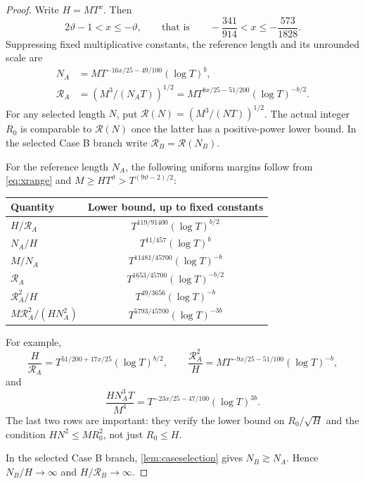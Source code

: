 \documentclass[11pt,reqno]{amsart}
\numberwithin{equation}{section}
\theoremstyle{definition}
\theoremstyle{remark}
\newcommand{\vth}{\vartheta}
\newcommand{\blocklog}{b}
\begin{document}
\begin{proof}
Write $H=MT^x$. Then
\begin{equation}\label{eq:xrange}
 2\vth-1<x\le-\vth,\qquad\text{that is}\qquad-\frac{341}{914}<x\le-\frac{573}{1828}.
\end{equation}
Suppressing fixed multiplicative constants, the reference length and its unrounded scale are
\begin{align}
 N_A&=M T^{-16x/25-49/100}(\log T)^{\blocklog},\\
 \mathcal R_A&=(M^3/(N_AT))^{1/2}
 =M T^{8x/25-51/200}(\log T)^{-\blocklog/2}.
\end{align}
For any selected length $N$, put $\mathcal R(N)=(M^3/(NT))^{1/2}$. The actual integer $R_0$ is comparable to $\mathcal R(N)$ once the latter has a positive-power lower bound. In the selected Case B branch write $\mathcal R_B=\mathcal R(N_B)$.

For the reference length $N_A$, the following uniform margins follow from \eqref{eq:xrange} and
$M\ge HT^{\vth}>T^{(9\vth-2)/2}$:
\begin{center}
\renewcommand{\arraystretch}{1.35}
\begin{tabular}{@{}lc@{}}
\toprule
Quantity & Lower bound, up to fixed constants\\
\midrule
$H/\mathcal R_A$ & $T^{119/91400}(\log T)^{\blocklog/2}$\\
$N_A/H$ & $T^{11/457}(\log T)^{\blocklog}$\\
$M/N_A$ & $T^{11481/45700}(\log T)^{-\blocklog}$\\
$\mathcal R_A$ & $T^{1653/45700}(\log T)^{-\blocklog/2}$\\
$\mathcal R_A^2/H$ & $T^{49/3656}(\log T)^{-\blocklog}$\\
$M\mathcal R_A^2/(HN_A^2)$ & $T^{5793/45700}(\log T)^{-3\blocklog}$\\
\bottomrule
\end{tabular}
\end{center}
For example,
\[
 \frac{H}{\mathcal R_A}=T^{51/200+17x/25}(\log T)^{\blocklog/2},
 \qquad \frac{\mathcal R_A^2}{H}
 =M T^{-9x/25-51/100}(\log T)^{-\blocklog},
\]
and
\[
 \frac{HN_A^3T}{M^4}
 =T^{-23x/25-47/100}(\log T)^{3\blocklog}.
\]
The last two rows are important: they verify the lower bound on $R_0/\sqrt H$ and the condition $HN^2\le MR_0^2$, not just $R_0\le H$.

In the selected Case B branch, \cref{lem:caseselection} gives $N_B\gtrsim N_A$. Hence $N_B/H\to\infty$ and $H/\mathcal R_B\to\infty$.


\end{proof}
\end{document}
